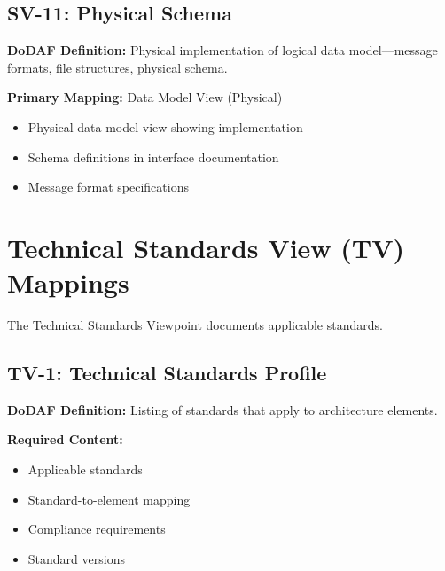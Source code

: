 \documentclass[11pt]{article}
\begin{document}
\subsection{SV-11: Physical Schema}

\begin{dodafbox}
\textbf{DoDAF Definition:} Physical implementation of logical data model---message formats, file structures, physical schema.
\end{dodafbox}

\begin{vbbox}
\textbf{Primary Mapping:} Data Model View (Physical)

\begin{itemize}
    \item Physical data model view showing implementation
    \item Schema definitions in interface documentation
    \item Message format specifications
\end{itemize}
\end{vbbox}

\section{Technical Standards View (TV) Mappings}

The Technical Standards Viewpoint documents applicable standards.

\subsection{TV-1: Technical Standards Profile}

\begin{dodafbox}
\textbf{DoDAF Definition:} Listing of standards that apply to architecture elements.

\textbf{Required Content:}
\begin{itemize}[nosep]
    \item Applicable standards
    \item Standard-to-element mapping
    \item Compliance requirements
    \item Standard versions
\end{itemize}
\end{dodafbox}
\end{document}
